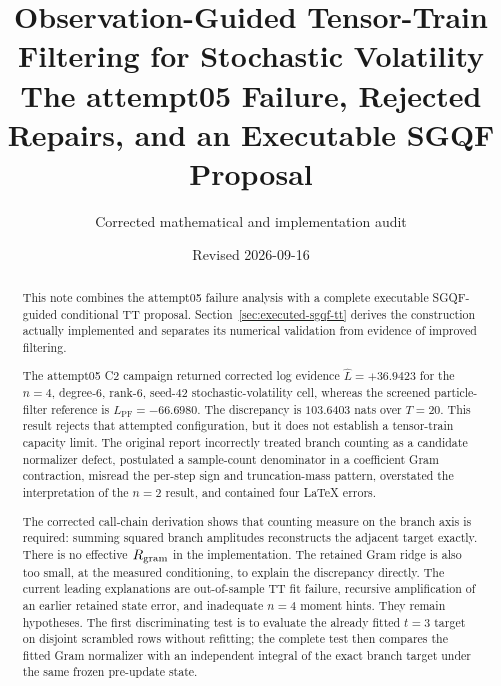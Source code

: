 \documentclass[11pt]{article}
\title{Observation-Guided Tensor-Train Filtering for Stochastic Volatility\\
\large The attempt05 Failure, Rejected Repairs, and an Executable SGQF Proposal}
\author{Corrected mathematical and implementation audit}
\date{Revised 2026-09-16}
\begin{document}
\maketitle

\begin{abstract}
This note combines the attempt05 failure analysis with a complete executable
SGQF-guided conditional TT proposal. Section~\ref{sec:executed-sgqf-tt}
derives the construction actually implemented and separates its numerical
validation from evidence of improved filtering.

The attempt05 C2 campaign returned corrected log evidence
$\widehat L=+36.9423$ for the $n=4$, degree-6, rank-6, seed-42
stochastic-volatility cell, whereas the screened particle-filter reference is
$L_{\mathrm{PF}}=-66.6980$. The discrepancy is $103.6403$ nats over $T=20$.
This result rejects that attempted configuration, but it does not establish a
tensor-train capacity limit. The original report incorrectly treated branch
counting as a candidate normalizer defect, postulated a sample-count
denominator in a coefficient Gram contraction, misread the per-step sign and
truncation-mass pattern, overstated the interpretation of the $n=2$ result,
and contained four LaTeX errors.

The corrected call-chain derivation shows that counting measure on the branch
axis is required: summing squared branch amplitudes reconstructs the adjacent
target exactly. There is no effective $R_{\rm gram}$ in the implementation.
The retained Gram ridge is also too small, at the measured conditioning, to
explain the discrepancy directly. The current leading explanations are
out-of-sample TT fit failure, recursive amplification of an earlier retained
state error, and inadequate $n=4$ moment hints. They remain hypotheses. The
first discriminating test is to evaluate the already fitted $t=3$ target on
disjoint scrambled rows without refitting; the complete test then compares the
fitted Gram normalizer with an independent integral of the exact branch target
under the same frozen pre-update state.


\end{abstract}
\end{document}
